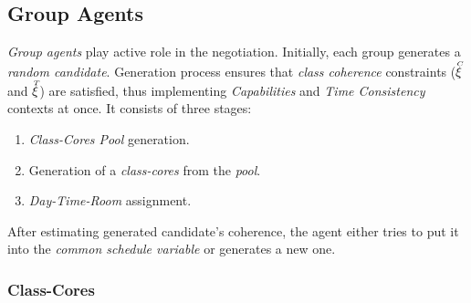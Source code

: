 \documentclass[../../ThesisDoc]{subfiles}
\begin{document}
\providecommand{\rootdir}{../..}


\providecommand{\seccmd}[1]{\secpartc{#1}}

\subsection{Group Agents}

\emph{Group agents} play active role in the negotiation.
Initially, each group generates a \emph{random candidate}.
Generation process ensures that \emph{class coherence} constraints
($\accentset{C}{\xi}$ and $\accentset{T}{\xi}$) are satisfied, thus implementing \textit{Capabilities}
and \textit{Time Consistency} contexts at once. It consists of three stages:
\begin{enumerate}
  \item \emph{Class-Cores Pool} generation.
  \item Generation of a \emph{class-cores} from the \emph{pool}.
  \item \emph{Day-Time-Room} assignment.
\end{enumerate}


\noindent
After estimating generated candidate's coherence, the agent either tries to put
it into the \emph{common schedule variable} or generates a new one.



\subsubsection{Class-Cores}
\label{sec:solution-CC}
\end{document}
